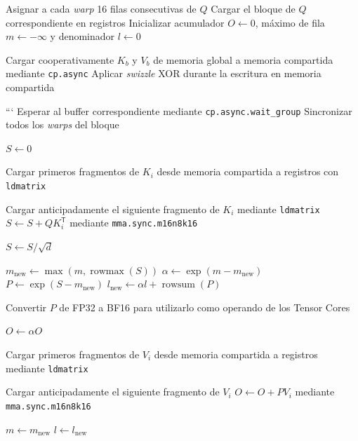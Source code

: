 \begin{algorithm}[H]
\caption{FlashAttention CUDA}
\begin{algorithmic}[1]

\State Asignar a cada \textit{warp} 16 filas consecutivas de \(Q\)
\State Cargar el bloque de \(Q\) correspondiente en registros
\State Inicializar acumulador \(O \gets 0\), máximo de fila \(m \gets -\infty\) y denominador \(l \gets 0\)

\State Cargar cooperativamente \(K_b\) y \(V_b\) de memoria global a memoria compartida mediante \texttt{cp.async}
\State Aplicar \textit{swizzle} XOR durante la escritura en memoria compartida
\EndFor


```
\State Esperar al buffer correspondiente mediante \texttt{cp.async.wait\_group}
\State Sincronizar todos los \textit{warps} del bloque

\State \(S \gets 0\)

\State Cargar primeros fragmentos de \(K_i\) desde memoria compartida a registros con \texttt{ldmatrix}

    \State Cargar anticipadamente el siguiente fragmento de \(K_i\) mediante \texttt{ldmatrix}
    \State \(S \gets S + QK_i^\mathsf{T}\) mediante \texttt{mma.sync.m16n8k16}
\EndFor

\State \(S \gets S/\sqrt{d}\)

\State \(m_{\mathrm{new}} \gets \max(m,\operatorname{rowmax}(S))\)
\State \(\alpha \gets \exp(m-m_{\mathrm{new}})\)
\State \(P \gets \exp(S-m_{\mathrm{new}})\)
\State \(l_{\mathrm{new}} \gets \alpha l + \operatorname{rowsum}(P)\)

\State Convertir \(P\) de FP32 a BF16 para utilizarlo como operando de los Tensor Cores

\State \(O \gets \alpha O\)

\State Cargar primeros fragmentos de \(V_i\) desde memoria compartida a registros mediante \texttt{ldmatrix}

    \State Cargar anticipadamente el siguiente fragmento de \(V_i\)
    \State \(O \gets O + PV_i\) mediante \texttt{mma.sync.m16n8k16}
\EndFor

\State \(m \gets m_{\mathrm{new}}\)
\State \(l \gets l_{\mathrm{new}}\)


\end{algorithmic}
\end{algorithm}
